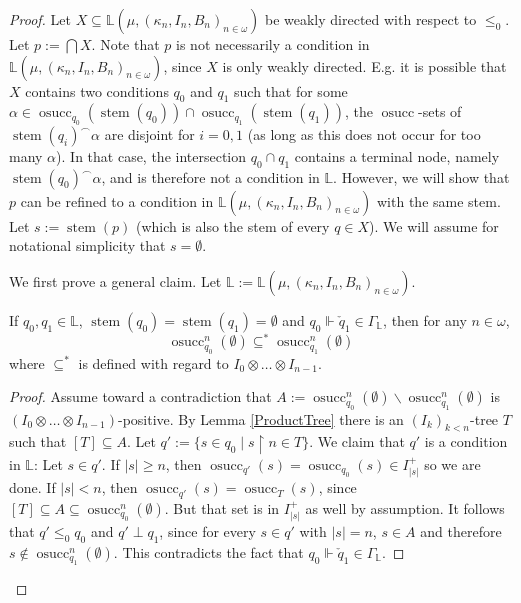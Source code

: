 \documentclass[10pt,a4paper]{amsart}
\DeclareMathOperator{\osucc}{osucc}
\DeclareMathOperator{\stem}{stem}
\newcommand{\dL}{\mathbb{L}}
\newcommand{\uhr}{\upharpoonright}
\begin{document}
	\begin{proof}
		Let $X\subseteq\dL(\mu,(\kappa_n,I_n,B_n)_{n\in\omega})$ be weakly directed with respect to $\leq_0$. Let $p:=\bigcap X$. Note that $p$ is not necessarily a condition in $\dL(\mu,(\kappa_n,I_n,B_n)_{n\in\omega})$, since $X$ is only weakly directed. E.g. it is possible that $X$ contains two conditions $q_0$ and $q_1$ such that for some $\alpha\in\osucc_{q_0}(\stem(q_0))\cap\osucc_{q_1}(\stem(q_1))$, the $\osucc$-sets of $\stem(q_i)^{\frown}\alpha$ are disjoint for $i=0,1$ (as long as this does not occur for too many $\alpha$). In that case, the intersection $q_0\cap q_1$ contains a terminal node, namely $\stem(q_0)^{\frown}\alpha$, and is therefore not a condition in $\dL$. However, we will show that $p$ can be refined to a condition in $\dL(\mu,(\kappa_n,I_n,B_n)_{n\in\omega})$ with the same stem. Let $s:=\stem(p)$ (which is also the stem of every $q\in X$). We will assume for notational simplicity that $s=\emptyset$.
		
		\setcounter{myclaim}{0}
		
		We first prove a general claim. Let $\dL:=\dL(\mu,(\kappa_n,I_n,B_n)_{n\in\omega})$.
		
		\begin{myclaim}\label{LClosureClaim1}
			If $q_0,q_1\in\dL$, $\stem(q_0)=\stem(q_1)=\emptyset$ and $q_0\Vdash\check{q}_1\in\Gamma_{\dL}$, then for any $n\in\omega$,
			$$\osucc_{q_0}^n(\emptyset)\subseteq^*\osucc_{q_1}^n(\emptyset)$$
			where $\subseteq^*$ is defined with regard to $I_0\otimes\dots\otimes I_{n-1}$.
		\end{myclaim}
		
		\begin{proof}
			Assume toward a contradiction that $A:=\osucc_{q_0}^n(\emptyset)\smallsetminus\osucc_{q_1}^n(\emptyset)$ is $ (I_0\otimes\dots\otimes I_{n-1})$-positive. By Lemma \ref{ProductTree} there is an $(I_k)_{k<n}$-tree $T$ such that $[T]\subseteq A$. Let $q':=\{s\in q_0\;|\;s\uhr n\in T\}$. We claim that $q'$ is a condition in $\dL$: Let $s\in q'$. If $|s|\geq n$, then $\osucc_{q'}(s)=\osucc_{q_0}(s)\in I_{|s|}^+$ so we are done. If $|s|<n$, then $\osucc_{q'}(s)=\osucc_T(s)$, since $[T]\subseteq A\subseteq\osucc_{q_0}^n(\emptyset)$. But that set is in $I_{|s|}^+$ as well by assumption. It follows that $q'\leq_0q_0$ and $q'\perp q_1$, since for every $s\in q'$ with $|s|=n$, $s\in A$ and therefore $s\notin\osucc_{q_1}^n(\emptyset)$. This  contradicts the fact that $q_0\Vdash\check{q}_1\in\Gamma_{\dL}$.
		\end{proof}
		

\end{proof}
\end{document}
